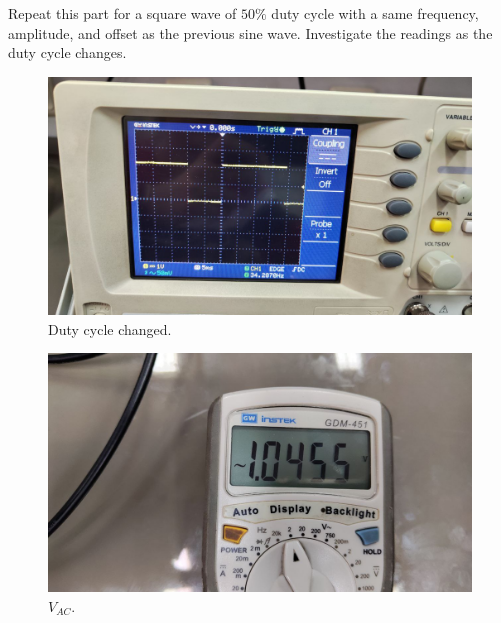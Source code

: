 \documentclass[11pt]{article}
\newcommand{\PicScale}{0.2}
\begin{document}
\begin{question}
\begin{subquestion}{Repeat this part for a square wave of $50\%$ duty cycle with a same frequency, amplitude, and offset as the previous sine wave. Investigate the readings as the duty cycle changes.}
{            \begin{figure}[H]
                \begin{center}
                    \includegraphics[scale=\PicScale]{Fig/33.jpeg}
                    \caption{Duty cycle changed.}
                \end{center}
            \end{figure}
            \begin{figure}[H]
                \begin{center}
                    \includegraphics[scale=\PicScale]{Fig/34.jpeg}
                    \caption{$V_{AC}$.}
                \end{center}
            \end{figure}

}
\end{subquestion}
\end{question}
\end{document}
